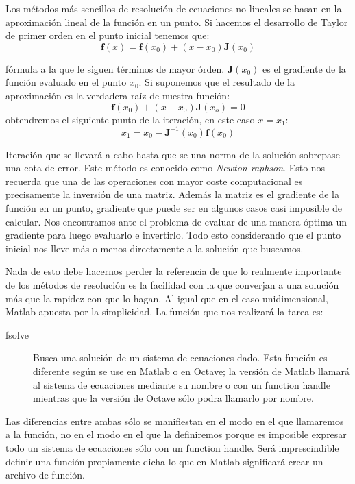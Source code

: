 Los métodos más sencillos de resolución de ecuaciones no lineales se
basan en la aproximación lineal de la función en un punto. Si hacemos
el desarrollo de Taylor de primer orden en el punto inicial tenemos
que:$$ \mathbf{f}(x)=\mathbf{f}(x_{0})+(x-x_{0})\mathbf{J}(x_{0})$$

fórmula a la que le siguen términos de mayor órden.
$\mathbf{J}(x_{0})$ es el gradiente de la función evaluado en el punto
$x_{0}$. Si suponemos que el resultado de la aproximación es la
verdadera raíz de nuestra función:
$$
\mathbf{f}(x_{0})+(x-x_{0})\mathbf{J}(x_{o})=0$$ obtendremos el
siguiente punto de la iteración, en este caso $x=x_{1}$:
$$x_{1}=x_{0}-\mathbf{J}^{-1}(x_{0})\mathbf{f}(x_{0})$$


Iteración que se llevará a cabo hasta que se una norma de la solución
sobrepase una cota de error. Este método es conocido como
\emph{Newton-raphson}.  Esto nos recuerda que una de las operaciones
con mayor coste computacional es precisamente la inversión de una
matriz. Además la matriz es el gradiente de la función en un punto,
gradiente que puede ser en algunos casos casi imposible de calcular.
Nos encontramos ante el problema de evaluar de una manera óptima un
gradiente para luego evaluarlo e invertirlo. Todo esto considerando
que el punto inicial nos lleve más o menos directamente a la solución
que buscamos.

Nada de esto debe hacernos perder la referencia de que lo realmente
importante de los métodos de resolución es la facilidad con la que
converjan a una solución más que la rapidez con que lo hagan. Al igual
que en el caso unidimensional, Matlab apuesta por la simplicidad.  La
función que nos realizará la tarea es:

\begin{description}
\item [fsolve]Busca una solución de un sistema de
  ecuaciones dado. Esta función es diferente según se use en Matlab o
  en Octave; la versión de Matlab llamará al sistema de ecuaciones
  mediante su nombre o con un function handle mientras que la versión
  de Octave sólo podra llamarlo por nombre.
\end{description}
Las diferencias entre ambas sólo se manifiestan en el modo en el que
llamaremos a la función, no en el modo en el que la definiremos porque
es imposible expresar todo un sistema de ecuaciones sólo con un
function handle. Será imprescindible definir una función propiamente
dicha lo que en Matlab significará crear un archivo de función.


